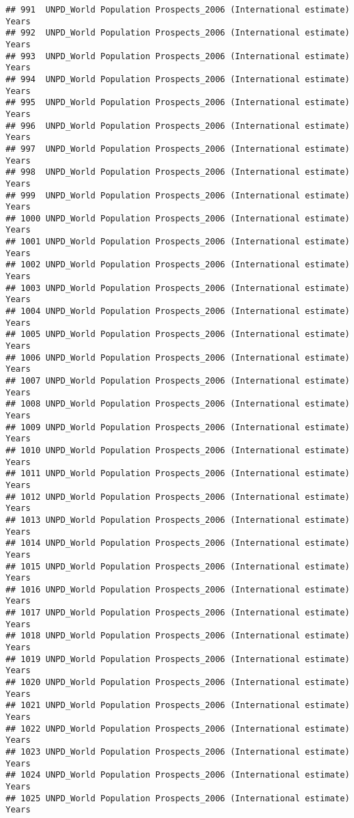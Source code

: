 \documentclass[]{article}
\begin{document}
\begin{verbatim}
## 991  UNPD_World Population Prospects_2006 (International estimate) Years
## 992  UNPD_World Population Prospects_2006 (International estimate) Years
## 993  UNPD_World Population Prospects_2006 (International estimate) Years
## 994  UNPD_World Population Prospects_2006 (International estimate) Years
## 995  UNPD_World Population Prospects_2006 (International estimate) Years
## 996  UNPD_World Population Prospects_2006 (International estimate) Years
## 997  UNPD_World Population Prospects_2006 (International estimate) Years
## 998  UNPD_World Population Prospects_2006 (International estimate) Years
## 999  UNPD_World Population Prospects_2006 (International estimate) Years
## 1000 UNPD_World Population Prospects_2006 (International estimate) Years
## 1001 UNPD_World Population Prospects_2006 (International estimate) Years
## 1002 UNPD_World Population Prospects_2006 (International estimate) Years
## 1003 UNPD_World Population Prospects_2006 (International estimate) Years
## 1004 UNPD_World Population Prospects_2006 (International estimate) Years
## 1005 UNPD_World Population Prospects_2006 (International estimate) Years
## 1006 UNPD_World Population Prospects_2006 (International estimate) Years
## 1007 UNPD_World Population Prospects_2006 (International estimate) Years
## 1008 UNPD_World Population Prospects_2006 (International estimate) Years
## 1009 UNPD_World Population Prospects_2006 (International estimate) Years
## 1010 UNPD_World Population Prospects_2006 (International estimate) Years
## 1011 UNPD_World Population Prospects_2006 (International estimate) Years
## 1012 UNPD_World Population Prospects_2006 (International estimate) Years
## 1013 UNPD_World Population Prospects_2006 (International estimate) Years
## 1014 UNPD_World Population Prospects_2006 (International estimate) Years
## 1015 UNPD_World Population Prospects_2006 (International estimate) Years
## 1016 UNPD_World Population Prospects_2006 (International estimate) Years
## 1017 UNPD_World Population Prospects_2006 (International estimate) Years
## 1018 UNPD_World Population Prospects_2006 (International estimate) Years
## 1019 UNPD_World Population Prospects_2006 (International estimate) Years
## 1020 UNPD_World Population Prospects_2006 (International estimate) Years
## 1021 UNPD_World Population Prospects_2006 (International estimate) Years
## 1022 UNPD_World Population Prospects_2006 (International estimate) Years
## 1023 UNPD_World Population Prospects_2006 (International estimate) Years
## 1024 UNPD_World Population Prospects_2006 (International estimate) Years
## 1025 UNPD_World Population Prospects_2006 (International estimate) Years

\end{verbatim}
\end{document}
